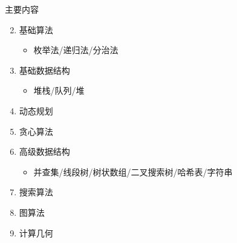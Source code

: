 \begin{frame}{主要内容}
    \begin{enumerate}
    \setcounter{enumi}{1}
        \item 基础算法
        \begin{itemize}
            \item 枚举法/递归法/分治法
        \end{itemize}
        \item 基础数据结构
        \begin{itemize}
            \item 堆栈/队列/堆
        \end{itemize}
        \item 动态规划
        \item 贪心算法
        \item 高级数据结构
        \begin{itemize}
            \item 并查集/线段树/树状数组/二叉搜索树/哈希表/字符串
        \end{itemize}
        \item 搜索算法
        \item 图算法
        \item 计算几何
    \end{enumerate}
\end{frame}
